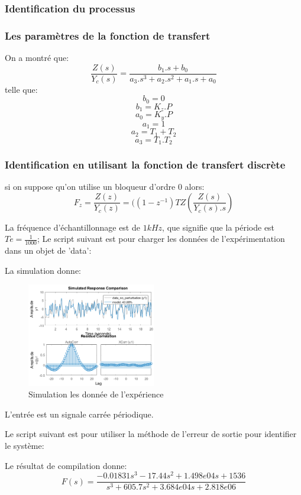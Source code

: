\documentclass[twoside,twocolumn]{article}
\begin{document}
\subsubsection{Identification du processus}

\subsubsection{Les paramètres de la fonction de transfert}
On a montré que:
$$\frac{Z(s)}{Y_c(s)} = \frac{b_1.s + b_0}{a_3.s^3 + a_2.s^2 + a_1.s + a_0}$$
telle que:\\
$$b_0 = 0$$  $$b_1 = K_z.P$$ $$a_0 = K_y.P$$ $$a_1 = 1$$ $$a_2 = T_1+T_2$$ $$a_3 = T_1.T_2$$
\subsubsection{Identification en utilisant la fonction de transfert discrète}
si on suppose qu'on utilise un bloqueur d'ordre 0 alors:
$$F_z = \frac{Z(z)}{Y_c(z)} = ((1-z^{-1})TZ(\frac{Z(s)}{Y_c(s).s})$$

La fréquence d'échantillonnage est de $1kHz$, que signifie que la période est $Te = \frac{1}{1000}$;
Le script suivant est pour charger les données de l'expérimentation dans un objet de 'data':
\label{matlab}


La simulation donne:
\begin{figure}[H]
\centering
\includegraphics[width=0.5\textwidth]{Images/13.png}
\caption{ Simulation les donnée de l'expérience}
\end{figure}

L'entrée est un signale carrée périodique.

Le script suivant est pour utiliser la méthode de l'erreur de sortie pour identifier le système:
\label{matlab}


Le résultat de compilation donne:
$$ F(s) = \frac{-0.01831 s^3 - 17.44 s^2 + 1.498e04 s + 1536}{s^3 + 605.7 s^2 + 3.684e04 s + 2.818e06} $$
\end{document}

